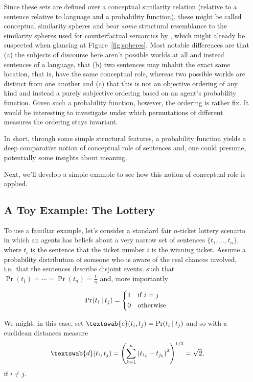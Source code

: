 \documentclass[11pt, a4paper]{scrartcl}
\renewcommand{\i}[1]{\emph{#1}}
\newcommand{\m}[1]{\textswab{#1}}
\newcommand{\given}[1][]{\:#1\vert\:}
\begin{document}
Since these sets are defined over a conceptual similarity relation (relative to a sentence relative to language and a probability function), these might be called conceptual similarity spheres and bear \i{some} structural resemblance to the similarity spheres used for counterfactual semantics by \textcite{Lewis1973-LEWC-2}, which might already be suspected when glancing at Figure~\ref{fig:spheres}. Most notable differences are that (a) the subjects of discourse here aren't possible worlds at all and instead sentences of a language, that (b) two sentences may inhabit the exact same location, that is, have the same conceptual role, whereas two possible worlds are distinct from one another and (c) that this is not an objective ordering of any kind and instead a purely subjective ordering based on an agent's probability function. Given such a probability function, however, the ordering is rather fix. It would be interesting to investigate under which permutations of different measures the ordering stays invariant.

In short, through some simple structural features, a probability function yields a deep comparative notion of conceptual role of sentences and, one could presume, potentially some insights about meaning.

Next, we'll develop a simple example to see how this notion of conceptual role is applied.

\subsection{A Toy Example: The Lottery}

To use a familiar example, let's consider a standard fair $n$-ticket lottery scenario in which an agents has beliefs about a very narrow set of sentences $\{ t_1, \dots, t_n\}$, where $t_i$ is the sentence that the ticket number $i$ is the winning ticket. Assume a probability distribution of someone who is aware of the real chances involved, i.e.\ that the sentences describe disjoint events, such that $\Pr(t_1) = \cdots = \Pr(t_n) = \frac{1}{n}$ and, more importantly

\[
    \Pr(t_i \given t_j)  =
    \begin{cases*}
        1 & if $i = j$ \\
        0        & otherwise
    \end{cases*}
\]

We might, in this case, set $\m{c}(t_i, t_j) = \Pr(t_i \given t_j)$ and so with a euclidean distances measure 
\[
    \m{d}(t_i,t_j) = {\left( \sum_{k=1}^n {(t_{i_k}-t_{j_k})}^2 \right)}^{1/2} = \sqrt{2},  
\]
if $i \not = j$.
\end{document}
